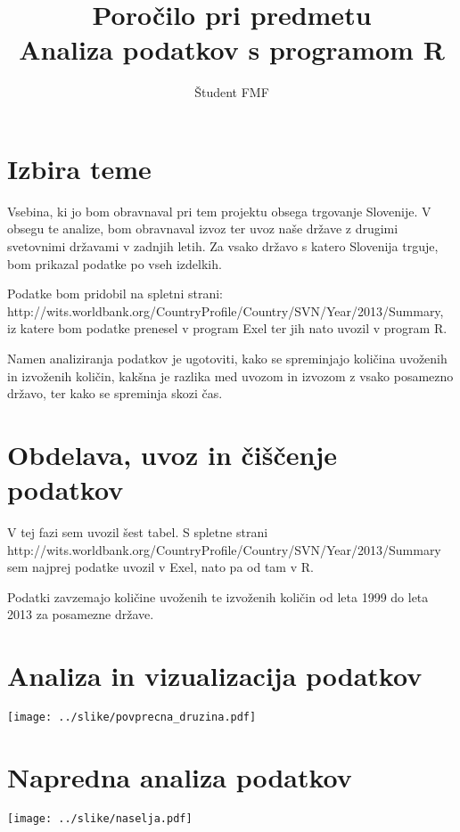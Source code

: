 \documentclass[11pt,a4paper]{article}
\begin{document}
\title{Poročilo pri predmetu \\
Analiza podatkov s programom R}
\author{Študent FMF}
\maketitle

\section{Izbira teme}
Vsebina, ki jo bom obravnaval pri tem projektu obsega trgovanje Slovenije. V obsegu te analize, bom obravnaval izvoz ter uvoz naše države z drugimi svetovnimi državami v zadnjih letih. Za vsako državo s katero Slovenija trguje, bom prikazal podatke po vseh izdelkih.

Podatke bom pridobil na spletni strani: http://wits.worldbank.org/CountryProfile/Country/SVN/Year/2013/Summary, iz katere bom podatke prenesel v program Exel ter jih nato uvozil v program R.

Namen analiziranja podatkov je ugotoviti, kako se spreminjajo količina uvoženih in izvoženih količin, kakšna je razlika med uvozom in izvozom z vsako posamezno državo, ter kako se spreminja skozi čas.

\section{Obdelava, uvoz in čiščenje podatkov}

V tej fazi sem uvozil šest tabel. S spletne strani http://wits.worldbank.org/CountryProfile/Country/SVN/Year/2013/Summary sem najprej podatke uvozil v Exel, nato pa od tam v R.

Podatki zavzemajo količine uvoženih te izvoženih količin od leta 1999 do leta 2013 za posamezne države.

\section{Analiza in vizualizacija podatkov}

\texttt{[image: ../slike/povprecna\_druzina.pdf]}

\section{Napredna analiza podatkov}

\texttt{[image: ../slike/naselja.pdf]}
\end{document}
